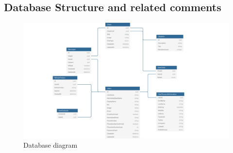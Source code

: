 \subsection{Database Structure and related comments}\label{subsec:database-structure-and-related-comments}
\begin{figure}[H]
    \centering
    \includegraphics[width=1\textwidth]{Pictures/Database_diagram}
    \caption{Database diagram}\label{fig:figure5}
\end{figure}


